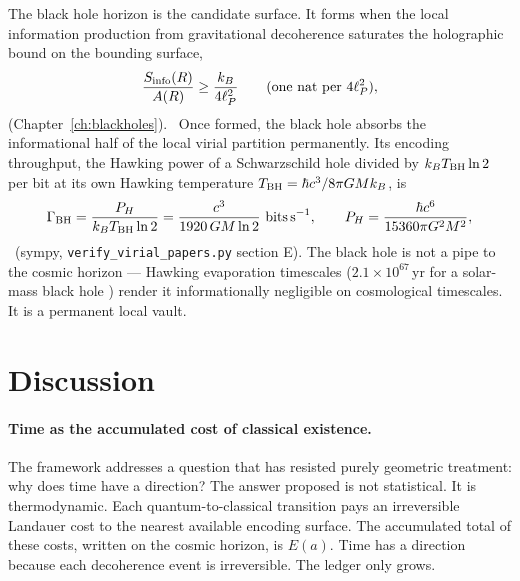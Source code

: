 The black hole horizon is the candidate surface. It forms when the local information production from gravitational decoherence saturates the holographic
bound on the bounding surface,
\begin{equation}
\frac{S_{\rm info}(R)}{A(R)}\ge\frac{k_B}{4\ell_P^2}\qquad(\text{one nat per }4\ell_P^2),\label{eq:vd_sat}
\end{equation}
(Chapter~\ref{ch:blackholes}). \conjecture\ Once formed, the black hole absorbs the informational half of the local virial partition permanently. Its
encoding throughput, the Hawking power of a Schwarzschild hole divided by $k_BT_{\rm BH}\ln2$ per bit at its own Hawking temperature $T_{\rm BH}=\hbar c^3/8\pi GMk_B$, is
\begin{equation}
\Gamma_{\rm BH}=\frac{P_H}{k_BT_{\rm BH}\ln2}=\frac{c^3}{1920\,GM\ln2}\ \text{bits\,s}^{-1},\qquad P_H=\frac{\hbar c^6}{15360\pi G^2M^2},\label{eq:vd_gamma}
\end{equation}
\derived\ (sympy, \texttt{verify\_virial\_papers.py} section E). The black hole is not a pipe to the cosmic horizon --- Hawking evaporation timescales
($2.1\times10^{67}$\,yr for a solar-mass black hole \calc) render it informationally negligible on cosmological timescales. It is a permanent local vault.


\section{Discussion}\label{sec:vd_discussion}
\paragraph{Time as the accumulated cost of classical existence.} The framework addresses a question that has resisted purely geometric treatment: why does
time have a direction? The answer proposed is not statistical. It is thermodynamic. Each quantum-to-classical transition pays an irreversible Landauer cost
to the nearest available encoding surface. The accumulated total of these costs, written on the cosmic horizon, is $E(a)$. Time has a direction because each
decoherence event is irreversible. The ledger only grows. \interp

